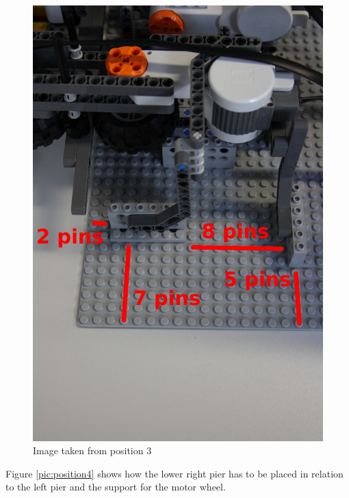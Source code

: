 \documentclass[%
  a4paper,%
  11pt,%
  blue,%
  hyperref	%
  ]{tubsartcl}
\begin{document}
\begin{figure}[!htb]
\begin{center}
\includegraphics[scale=0.35]{graphics_lego/position3.jpg}
\end{center}
\caption{Image taken from position 3}
\label{pic:position3}
\end{figure}

\newpage

Figure \ref{pic:position4} shows how the lower right pier has to be placed in relation to the left pier and the support for the motor wheel.
\end{document}
